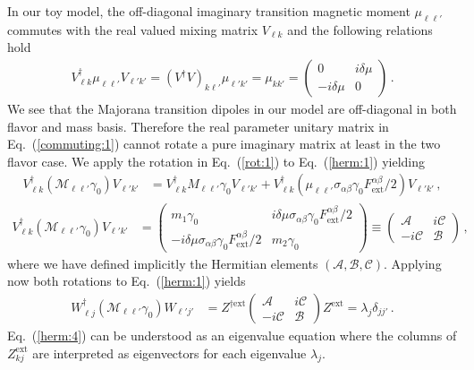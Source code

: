 \documentclass{ws-ijmpa}
\newcommand{\req}[1]{Eq.~(\ref{#1})}
\begin{document}
In our toy model, the off-diagonal imaginary transition magnetic moment  $\mu_{\ell\ell'}$ commutes with the real valued mixing matrix $V_{\ell k}$ and the following relations hold
\begin{align}
\label{commuting:1}
V_{\ell k}^{\dag}\mu_{\ell\ell'}V_{\ell' k'}=(V^{\dag}V)_{k\ell'}\mu_{\ell'k'}=\mu_{kk'}=
\begin{pmatrix}
0 & i\delta\mu\\
-i\delta\mu & 0
\end{pmatrix}\,.
\end{align}
We see that the Majorana transition dipoles in our model are off-diagonal in both flavor and mass basis. Therefore the real parameter unitary matrix in \req{commuting:1} cannot rotate a pure imaginary matrix at least in the two flavor case. We apply the rotation in \req{rot:1} to \req{herm:1} yielding
\begin{align}
\label{herm:2}
V_{\ell k}^{\dag}(\mathcal{M}_{\ell\ell'}\gamma_{0})V_{\ell' k'} &= 
V_{\ell k}^{\dag}M_{\ell\ell'}\gamma_{0}V_{\ell' k'} +
V_{\ell k}^{\dag}(\mu_{\ell\ell'}\sigma_{\alpha\beta}\gamma_{0}F^{\alpha\beta}_\mathrm{ext}/2)V_{\ell' k'}\,,
\end{align}
%
\begin{align}
\label{herm:3}
V_{\ell k}^{\dag}(\mathcal{M}_{\ell\ell'}\gamma_{0})V_{\ell' k'} &= 
\begin{pmatrix}
m_{1}\gamma_{0} & i\delta\mu\sigma_{\alpha\beta}\gamma_{0}F^{\alpha\beta}_\mathrm{ext}/2\\
-i\delta\mu\sigma_{\alpha\beta}\gamma_{0}F^{\alpha\beta}_\mathrm{ext}/2 & m_{2}\gamma_{0}
\end{pmatrix}\equiv
\begin{pmatrix}
\mathcal{A} & i\mathcal{C}\\
-i\mathcal{C} & \mathcal{B}
\end{pmatrix}\,,
\end{align}
where we have defined implicitly the Hermitian elements $(\mathcal{A},\mathcal{B},\mathcal{C})$.  Applying now both rotations 
to \req{herm:1} yields
\begin{align}
\label{herm:4}
W_{\ell j}^{\dag}(\mathcal{M}_{\ell\ell'}\gamma_{0})W_{\ell' j'} &= 
Z^{\dag\mathrm{ext}}\begin{pmatrix}
\mathcal{A} & i\mathcal{C}\\
-i\mathcal{C} & \mathcal{B}
\end{pmatrix}Z^\mathrm{ext}=\lambda_{j}\delta_{jj'}\,.
\end{align}
\req{herm:4} can be understood as an eigenvalue equation where the columns of $Z_{kj}^\mathrm{ext}$ are interpreted as eigenvectors for each eigenvalue $\lambda_{j}$.
\end{document}
